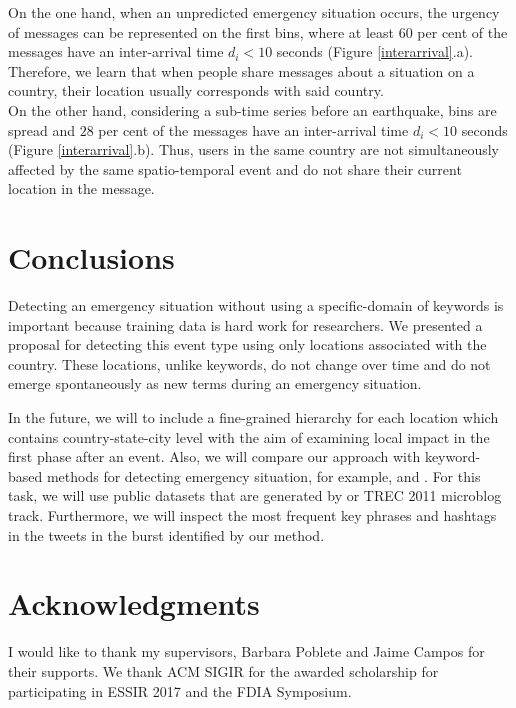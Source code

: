 \documentclass{ewic}
\begin{document}
On the one hand, when an unpredicted emergency situation occurs, the urgency of messages can be represented on the first bins, where at least $60$ per cent of the messages have an inter-arrival time $d_{i} < 10$ seconds (Figure \ref{interarrival}.a). Therefore, we learn that when people share messages about a situation on a country, their location usually corresponds with said country.
\\
On the other hand, considering a sub-time series before an earthquake, bins are spread and $28$ per cent of the messages have an inter-arrival time $d_{i} < 10$ seconds (Figure \ref{interarrival}.b). Thus, users in the same country are not simultaneously affected by the same spatio-temporal event and do not share their current location in the message.

\section{Conclusions}
Detecting an emergency situation without using a specific-domain of keywords is important because training data is hard work for researchers. We presented a proposal for detecting this event type using only locations associated with the country. These locations, unlike keywords, do not change over time and do not emerge spontaneously as new terms during an emergency situation.

In the future, we will to include a fine-grained hierarchy for each location which contains country-state-city level with the aim of examining local impact in the first phase after an event. Also, we will compare our approach with keyword-based methods for detecting emergency situation, for example, \cite{kumar2011tweettracker} and \cite{cameron2012emergency}. For this task, we will use public datasets that are generated by \cite{imranaidr2014} or TREC 2011 microblog track. Furthermore, we will inspect the most frequent key phrases and hashtags in the tweets in the burst identified by our method.

\section{Acknowledgments}

I would like to thank my supervisors, Barbara Poblete and Jaime Campos for their supports. We thank ACM SIGIR for the awarded scholarship for participating in ESSIR 2017 and the FDIA Symposium.
\end{document}
